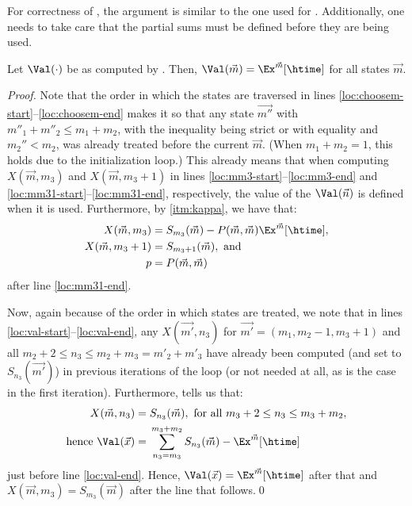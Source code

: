 For correctness of , the argument is similar to the one used for . Additionally, one needs to take care that the partial sums must be defined before they are being used.
\begin{theorem}[Correctess]
    Let $\Val(\cdot)$ be as computed by . Then, $\Val(\vec{m}) = \Ex^{\vec{m}}[\htime]$ for all states $\vec{m}$.
\end{theorem}
\begin{proof}
    Note that the order in which the states are traversed in lines
    \ref{loc:choosem-start}--\ref{loc:choosem-end} makes it so that any state
    $\vec{m''}$ with $m''_1+m''_2 \leq m_1 + m_2$, with the inequality being
    strict or with equality and $m_2'' < m_2$, was already treated before the
    current $\vec{m}$. (When $m_1 + m_2 = 1$, this holds due to the
    initialization loop.) This already means that when computing
    $X(\vec{m},m_3)$ and $X(\vec{m},m_3+1)$ in lines
    \ref{loc:mm3-start}--\ref{loc:mm3-end} and
    \ref{loc:mm31-start}--\ref{loc:mm31-end}, respectively, the value of the
    $\Val(\vec{n})$ is defined when it is used. Furthermore, by
     \cref{itm:kappa}, we have that:
    \begin{align*}
      X(\vec{m},m_3) ={} & S_{m_3}(\vec{m}) - P(\vec{m},\vec{m})
      \Ex^{\vec{m}}[\htime],\\
      X(\vec{m},m_3+1) = {} & S_{m_3+1}(\vec{m}), \text{ and}\\
      p = {} & P(\vec{m},\vec{m})
    \end{align*}
    after line \ref{loc:mm31-end}.

    Now, again because of the order in which states are treated, we note that
    in lines \ref{loc:val-start}--\ref{loc:val-end}, any $X(\vec{m'},n_3)$ for
    $\vec{m'} = (m_1,m_2-1,m_3+1)$ and all $m_2 + 2 \leq n_3 \leq m_2 + m_3 =
    m'_2 + m'_3$ have already been computed (and set to $S_{n_3}(\vec{m'})$)
    in previous iterations of the loop (or not needed at all, as is the case
    in the first iteration).  Furthermore,  tells us that:
    \begin{align*}
      X(\vec{m},n_3) = {} & S_{n_3}(\vec{m}), \text{ for all } m_3 + 2 \leq n_3 \leq m_3 + m_2,\\
      \text{hence } \Val(\vec{x}) = {} & \sum_{n_3=m_3}^{m_3+m_2} S_{n_3}(\vec{m}) -
      \Ex^{\vec{m}}[\htime]
    \end{align*}
    just before line \ref{loc:val-end}. Hence, $\Val(\vec{x}) =
    \Ex^{\vec{m}}[\htime]$ after that and $X(\vec{m},m_3) = S_{m_3}(\vec{m})$
    after the line that follows.\qed
\end{proof}